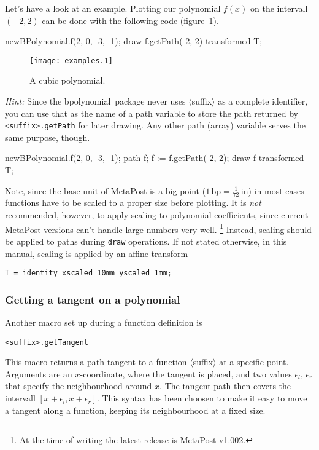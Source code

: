 \documentclass{article}
\newcommand*{\cmd}[1]{\texttt{#1}}
\newcommand*{\name}[1]{\textsf{#1}}
\newcommand*{\pkg}{\name{bpolynomial}}
\begin{document}
Let's have a look at an example.  Plotting our polynomial $f(x)$ on the intervall $(-2, 2)$ can be done with the following code (figure~\ref{fig:cubic}).
\begin{listing}
  newBPolynomial.f(2, 0, -3, -1);
  draw f.getPath(-2, 2) transformed T;
\end{listing}

\begin{figure}
    \centering
    \texttt{[image: examples.1]}
    \caption{A cubic polynomial.}
    \label{fig:cubic}
\end{figure}

\emph{Hint:} Since the \pkg\ package never uses $\langle$suffix$\rangle$ as a complete identifier, you can use that as the name of a path variable to store the path returned by \cmd{<suffix>.getPath} for later drawing.  Any other path (array) variable serves the same purpose, though.
\begin{listing}
  newBPolynomial.f(2, 0, -3, -1);
  path f;
  f := f.getPath(-2, 2);
  draw f transformed T;
\end{listing}

Note, since the base unit of MetaPost is a big point ($1\,\text{bp}=\frac{1}{72}\,\text{in}$) in most cases functions have to be scaled to a proper size before plotting.  It is \emph{not} recommended, however, to apply scaling to polynomial coefficients, since current MetaPost versions can't handle large numbers very well.%
\footnote{At the time of writing the latest release is MetaPost v1.002.}
Instead, scaling should be applied to paths during \cmd{draw} operations.  If not stated otherwise, in this manual, scaling is applied by an affine transform
\begin{center}
  \cmd{T = identity xscaled 10mm yscaled 1mm;}
\end{center}

\subsubsection{Getting a tangent on a polynomial}\label{sec:getTangent}
Another macro set up during a function definition is
\begin{center}
  \cmd{<suffix>.getTangent}
\end{center}
This macro returns a path tangent to a function $\langle$suffix$\rangle$ at a specific point.  Arguments are an $x$-coordinate, where the tangent is placed, and two values $\epsilon_l$, $\epsilon_r$ that specify the neighbourhood around $x$.  The tangent path then covers the intervall $[x+\epsilon_l,x+\epsilon_r]$.  This syntax has been choosen to make it easy to move a tangent along a function, keeping its neighbourhood at a fixed size.
\end{document}

